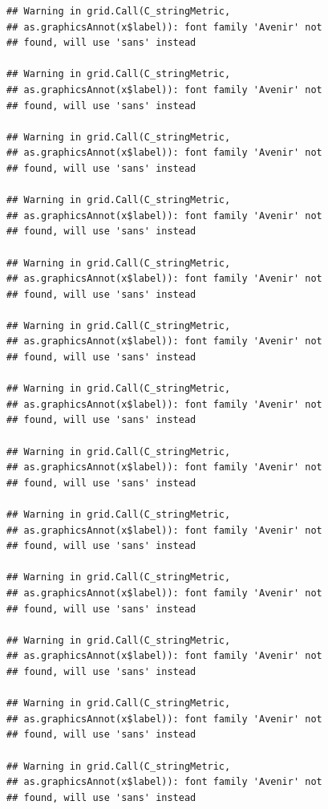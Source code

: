 \documentclass[]{krantz}
\begin{document}
\begin{verbatim}
## Warning in grid.Call(C_stringMetric,
## as.graphicsAnnot(x$label)): font family 'Avenir' not
## found, will use 'sans' instead

## Warning in grid.Call(C_stringMetric,
## as.graphicsAnnot(x$label)): font family 'Avenir' not
## found, will use 'sans' instead

## Warning in grid.Call(C_stringMetric,
## as.graphicsAnnot(x$label)): font family 'Avenir' not
## found, will use 'sans' instead

## Warning in grid.Call(C_stringMetric,
## as.graphicsAnnot(x$label)): font family 'Avenir' not
## found, will use 'sans' instead

## Warning in grid.Call(C_stringMetric,
## as.graphicsAnnot(x$label)): font family 'Avenir' not
## found, will use 'sans' instead

## Warning in grid.Call(C_stringMetric,
## as.graphicsAnnot(x$label)): font family 'Avenir' not
## found, will use 'sans' instead

## Warning in grid.Call(C_stringMetric,
## as.graphicsAnnot(x$label)): font family 'Avenir' not
## found, will use 'sans' instead

## Warning in grid.Call(C_stringMetric,
## as.graphicsAnnot(x$label)): font family 'Avenir' not
## found, will use 'sans' instead

## Warning in grid.Call(C_stringMetric,
## as.graphicsAnnot(x$label)): font family 'Avenir' not
## found, will use 'sans' instead

## Warning in grid.Call(C_stringMetric,
## as.graphicsAnnot(x$label)): font family 'Avenir' not
## found, will use 'sans' instead

## Warning in grid.Call(C_stringMetric,
## as.graphicsAnnot(x$label)): font family 'Avenir' not
## found, will use 'sans' instead

## Warning in grid.Call(C_stringMetric,
## as.graphicsAnnot(x$label)): font family 'Avenir' not
## found, will use 'sans' instead

## Warning in grid.Call(C_stringMetric,
## as.graphicsAnnot(x$label)): font family 'Avenir' not
## found, will use 'sans' instead
\end{verbatim}
\end{document}
